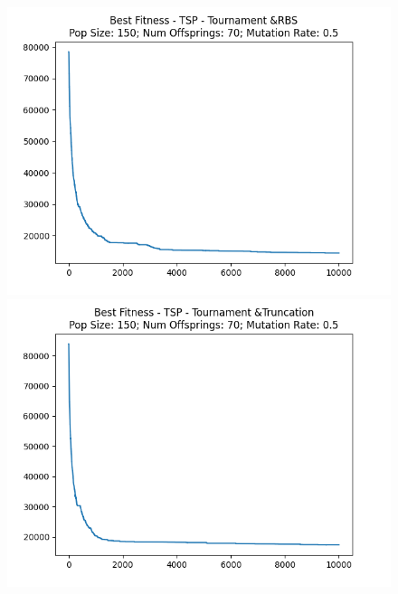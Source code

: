 \documentclass[12pt]{report}
\theoremstyle{mytheoremstyle}
\theoremstyle{mytheoremstyle}
\theoremstyle{myproblemstyle}
\begin{document}
\begin{figure}[!]
\begin{minipage}{0.4\textwidth}
		\includegraphics[width=\linewidth]{../Analysis/BSF_TSP_2_1_150_70.png}
	\end{minipage}
	\hspace{\fill}
	\begin{minipage}{0.4\textwidth}
		\includegraphics[width=\linewidth]{../Analysis/BSF_TSP_2_3_150_70.png}
	\end{minipage}
	\vspace*{1cm}
	\begin{minipage}{0.4\textwidth}

\end{minipage}
\end{figure}
\end{document}
